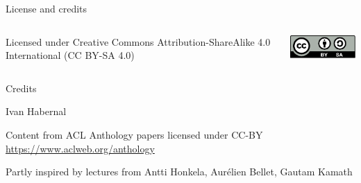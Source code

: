 \documentclass[12pt,aspectratio=169,handout]{beamer}
\begin{document}
\begin{frame}{License and credits}

	\begin{columns}
		\begin{column}{0.7\textwidth}
			Licensed under Creative Commons Attribution-ShareAlike 4.0 International (CC BY-SA 4.0)
		\end{column}
		\begin{column}{0.2\textwidth}
			\includegraphics[width=0.9\linewidth]{img/cc-by-sa-icon.pdf}
		\end{column}
	\end{columns}
	
	\bigskip
	
	Credits
	
	\begin{scriptsize}
		
		Ivan Habernal
		
		Content from ACL Anthology papers licensed under CC-BY \url{https://www.aclweb.org/anthology}
		
		Partly inspired by lectures from Antti Honkela, Aurélien Bellet, Gautam Kamath
	
	\end{scriptsize}
	
\end{frame}
\end{document}
